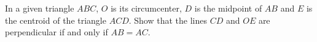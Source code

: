 In a given triangle $ABC$,  $O$ is its circumcenter, $D$ is the midpoint of $AB$ and $E$ is the centroid of the triangle $ACD$. Show that the lines $CD$ and $OE$ are perpendicular if and only if $AB=AC$.